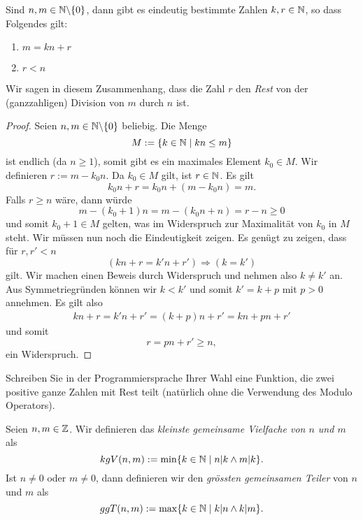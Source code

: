 \begin{satz}
 Sind $n,m\in\mathbb{N}\backslash\{0\}$, dann gibt es eindeutig bestimmte Zahlen $k,r\in\mathbb{N}$, so dass Folgendes gilt:
\begin{enumerate}
\item $m=kn+r$
 \item $r<n$
\end{enumerate}
Wir sagen in diesem Zusammenhang, dass die Zahl $r$ den \textit{Rest} von der (ganzzahligen) Division von $m$ durch $n$ ist.
\end{satz}
\begin{proof}
 Seien $n,m\in\mathbb{N}\backslash\{0\}$ beliebig. Die Menge
\[
 M:=\{k\in\mathbb{N}\mid kn\leq m\}
\]
ist endlich (da $n\geq 1$), somit gibt es ein maximales Element $k_0\in M$. Wir definieren $r:=m-k_0n$. Da $k_0\in M$ gilt, ist $r\in\mathbb{N}$. Es gilt
\[
 k_0n+r=k_0n+(m-k_0n)=m.
\]
Falls $r\geq n$ wäre, dann würde
\[
 m-(k_0+1)n=m-(k_0n+n)=r-n\geq 0
\]
und somit $k_0+1\in M$ gelten, was im Widerspruch zur Maximalität von $k_0$ in $M$ steht. Wir müssen nun noch die Eindeutigkeit zeigen. Es genügt zu zeigen, dass für $r,r'<n$
\[
 (kn+r=k'n+r')\Rightarrow (k=k')
\]
gilt. Wir machen einen Beweis durch Widerspruch und nehmen also $k\neq k'$ an. Aus Symmetriegründen können wir $k<k'$ und somit $k'=k+p$ mit $p>0$ annehmen. Es gilt also
\begin{align*}
 kn+r=k'n+r'=(k+p)n+r'=kn+pn+r'
\end{align*}
und somit
\[
 r=pn+r'\geq n,
\]
ein Widerspruch.
\end{proof}

\begin{ueb}
	Schreiben Sie in der Programmiersprache Ihrer Wahl eine Funktion, die zwei positive ganze Zahlen mit Rest teilt (natürlich ohne die Verwendung des Modulo Operators).
\end{ueb}
\begin{lsg}
\end{lsg}

\begin{df}
Seien $n,m\in\mathbb{Z}$. Wir definieren das \textit{kleinste gemeinsame Vielfache von $n$ und $m$} als
\[
 kgV(n,m):=\min\{k\in\mathbb{N}\mid n|k\wedge m|k\}.
\]
Ist $n\neq0$ oder $ m\neq 0$, dann definieren wir den \textit{grössten gemeinsamen Teiler} von $n$ und $m$ als
\[
 ggT(n,m):=\max\{k\in\mathbb{N}\mid k|n\wedge k|m\}.
\]
\end{df}

